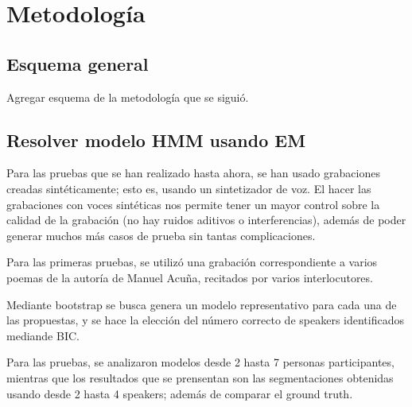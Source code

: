 
\chapter{Metodología}


\section{Esquema general} 

Agregar esquema de la metodología que se siguió.

\section{Resolver modelo HMM usando EM} 
\label{sec:sd-hmm-em}

Para las pruebas que se han realizado hasta ahora, se han usado grabaciones creadas sintéticamente; esto es, usando un sintetizador de voz. El hacer las grabaciones con voces sintéticas nos permite tener un mayor control sobre la calidad de la grabación (no hay ruidos aditivos o interferencias), además de poder generar muchos más casos de prueba sin tantas complicaciones.

Para las primeras pruebas, se utilizó una grabación correspondiente a varios poemas de la autoría de Manuel Acuña, recitados por varios interlocutores.

Mediante bootstrap se busca genera un modelo representativo para cada una de las propuestas, y  se hace la elección del número correcto de speakers identificados mediande BIC.

Para las pruebas, se analizaron modelos desde 2 hasta 7 personas participantes, mientras que los resultados que se prensentan son las segmentaciones obtenidas usando desde 2 hasta 4 speakers; además de comparar el ground truth.

